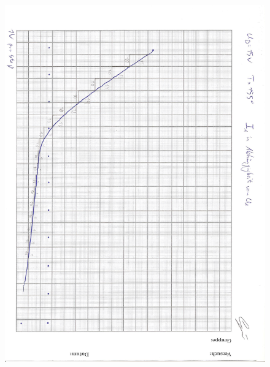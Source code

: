 \begin{figure}[H]
    \label{fig:Abb2}
    \centering
    \includegraphics[height=25cm]{"Energieverteilung2.jpg"}
\end{figure}

